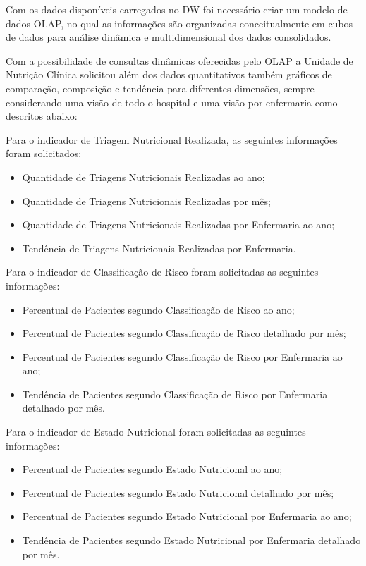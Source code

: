 Com os dados disponíveis carregados no DW foi necessário criar um modelo de dados OLAP, no qual as informações são organizadas conceitualmente em cubos de dados para análise dinâmica e multidimensional dos dados consolidados.

Com a possibilidade de consultas dinâmicas oferecidas pelo OLAP a Unidade de Nutrição Clínica solicitou além dos dados quantitativos também gráficos de comparação, composição e tendência para diferentes dimensões, sempre considerando uma visão de todo o hospital e uma visão por enfermaria como descritos abaixo: 

Para o indicador de Triagem Nutricional Realizada, as seguintes informações foram solicitados:
\begin{itemize}
    \item Quantidade de Triagens Nutricionais Realizadas ao ano;
    \item Quantidade de Triagens Nutricionais Realizadas por mês;
    \item Quantidade de Triagens Nutricionais Realizadas por Enfermaria ao ano;
    \item Tendência de Triagens Nutricionais Realizadas por Enfermaria.
\end{itemize}

Para o indicador de Classificação de Risco foram solicitadas as seguintes informações:
\begin{itemize}
    \item Percentual de Pacientes segundo Classificação de Risco ao ano;
    \item Percentual de Pacientes segundo Classificação de Risco detalhado por mês;
    \item Percentual de Pacientes segundo Classificação de Risco por Enfermaria ao ano;
    \item Tendência de Pacientes segundo Classificação de Risco por Enfermaria detalhado por mês.
\end{itemize}

Para o indicador de Estado Nutricional foram solicitadas as seguintes informações:
\begin{itemize}
    \item Percentual de Pacientes segundo Estado Nutricional ao ano;
    \item Percentual de Pacientes segundo Estado Nutricional detalhado por mês;
    \item Percentual de Pacientes segundo Estado Nutricional por Enfermaria ao ano;
    \item Tendência de Pacientes segundo Estado Nutricional por Enfermaria detalhado por mês.
\end{itemize}


